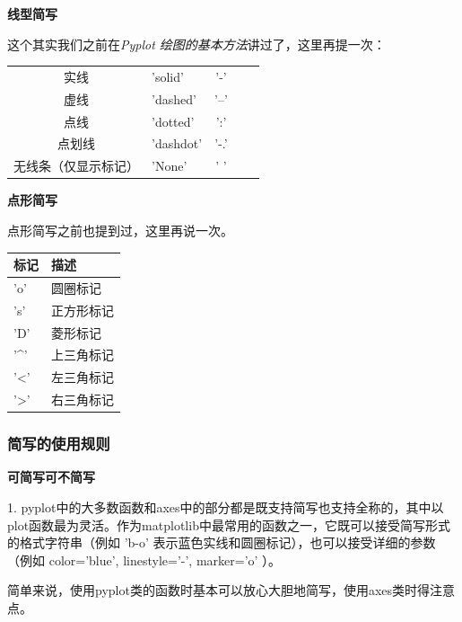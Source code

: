 \documentclass[12pt]{article}
\begin{document}
\noindent\textbf{\large 线型简写}

这个其实我们之前在\textit{Pyplot 绘图的基本方法}讲过了，这里再提一次：
\begin{table}[H]
\centering
\begin{tabularx}{0.8\textwidth}{|c|>{\centering\arraybackslash}X|c|>{\centering\arraybackslash}X|X|}
实线         & 'solid'   & '-'  \\
虚线         & 'dashed'  & '--' \\
点线         & 'dotted'  & ':'  \\
点划线        & 'dashdot' & '-.' \\
无线条（仅显示标记） & 'None'    & ' ' 
\end{tabularx}
\end{table}
\newpage
\noindent\textbf{\large 点形简写}

点形简写之前也提到过，这里再说一次。
\begin{table}[H]
\centering
\begin{tabular}{@{}ll@{}}
\toprule
标记                   & 描述    \\ \midrule
'o'                  & 圆圈标记  \\
's'                  & 正方形标记 \\
'D'                  & 菱形标记 \\
'\textasciicircum{}' & 上三角标记 \\
'\textless{}'        & 左三角标记 \\
'\textgreater{}'     & 右三角标记 \\ \bottomrule
\end{tabular}
\end{table}

\subsubsection{简写的使用规则}\label{简写的使用规则}

\noindent\textbf{\large 可简写可不简写}

1. pyplot中的大多数函数和axes中的部分都是既支持简写也支持全称的，其中以plot函数最为灵活。作为matplotlib中最常用的函数之一，它既可以接受简写形式的格式字符串（例如 'b-o' 表示蓝色实线和圆圈标记），也可以接受详细的参数（例如 color='blue', linestyle='-', marker='o' ）。

简单来说，使用pyplot类的函数时基本可以放心大胆地简写，使用axes类时得注意点。
\end{document}
